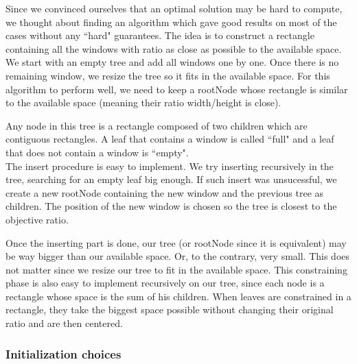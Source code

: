 \documentclass{acmtog}
\begin{document}
Since we convinced ourselves that an optimal solution may be hard to compute, we thought about finding an algorithm which gave good results on most of the cases without any ``hard" guarantees. The idea is to construct a rectangle containing all the windows with ratio as close as possible to the available space. We start with an empty tree and add all windows one by one. Once there is no remaining window, we resize the tree so it fits in the available space. For this algorithm to perform well, we need to keep a rootNode whose rectangle is similar to the available space (meaning their ratio width/height is close). 

Any node in this tree is a rectangle composed of two children which are contiguous rectangles. A leaf that contains a window is called ``full" and a leaf that does not contain a window is ``empty".  \\

The insert procedure is easy to implement. We try inserting recursively in the tree, searching for an empty leaf big enough. If such insert was unsucessful, we create a new rootNode containing the new window and the previous tree as children. The position of the new window is chosen so the tree is closest to the objective ratio. 


Once the inserting part is done, our tree (or rootNode since it is equivalent) may be way bigger than our available space. Or, to the contrary, very small. This does not matter since we resize our tree to fit in the available space. This constraining phase is also easy to implement recursively on our tree, since each node is a rectangle whose space is the sum of his children. When leaves are constrained in a rectangle, they take the biggest space possible without changing their original ratio and are then centered. 

\subsubsection{Initialization choices}
\end{document}

